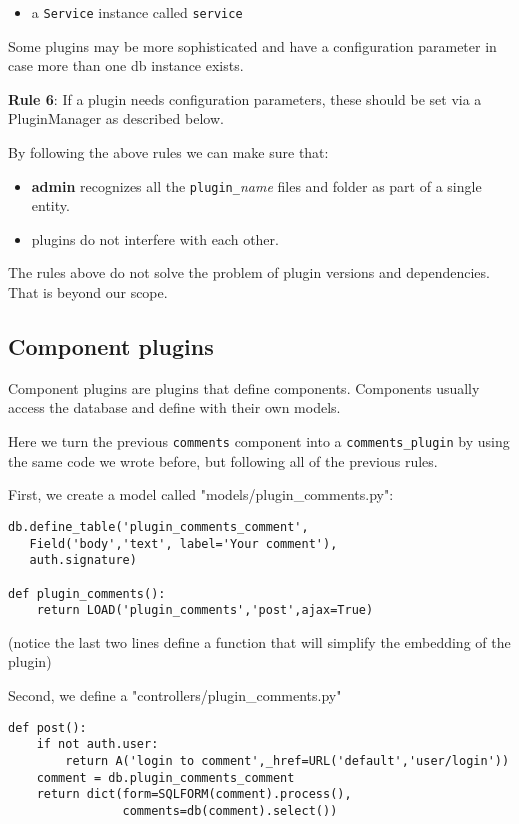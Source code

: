 \documentclass[justified,sixbynine,notoc]{tufte-book}
\def\ft{\small\tt}
\def\inxx#1{\index{#1}}
\begin{document}
\begin{fullwidth}
\begin{itemize}
\item a {\ft Service} instance called {\ft service}
\end{itemize}

Some plugins may be more sophisticated and have a configuration parameter in case more than one db instance exists.

{\bf Rule 6}:
If a plugin needs configuration parameters, these should be set via a PluginManager as described below.
\inxx{PluginManager}

By following the above rules we can make sure that:
\begin{itemize}
\item {\bf admin} recognizes all the {\ft plugin\_}{\it name} files and folder as part of a single entity.

\item plugins do not interfere with each other.
\end{itemize}

The rules above do not solve the problem of plugin versions and dependencies. That is beyond our scope.

\goodbreak\subsection{Component plugins}

\inxx{component plugin}

Component plugins are plugins that define components. Components usually access the database and define with their own models.

Here we turn the previous {\ft comments} component into a {\ft comments\_plugin} by using the same code we wrote before, but following all of the previous rules.

First, we create a model called "models/plugin\_comments.py":

\begin{lstlisting}
db.define_table('plugin_comments_comment',
   Field('body','text', label='Your comment'),
   auth.signature)

def plugin_comments():
    return LOAD('plugin_comments','post',ajax=True)
\end{lstlisting}
(notice the last two lines define a function that will simplify the embedding of the plugin)

Second, we define a "controllers/plugin\_comments.py"

\begin{lstlisting}
def post():
    if not auth.user:
        return A('login to comment',_href=URL('default','user/login'))
    comment = db.plugin_comments_comment
    return dict(form=SQLFORM(comment).process(),
                comments=db(comment).select())
\end{lstlisting}


\end{fullwidth}
\end{document}

